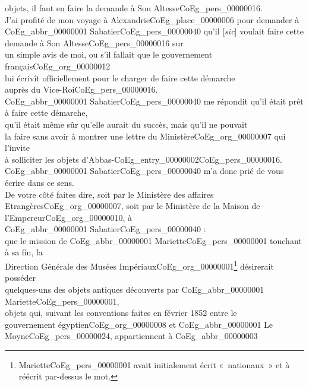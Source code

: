 \documentclass{book}
\begin{document}
objets, il faut en faire la demande à Son Altesse\gls{CoEg_pers_00000016}.\\
\indent J’ai profité de mon voyage à Alexandrie\gls{CoEg_place_00000006} pour demander à\\
\gls{CoEg_abbr_00000001} Sabatier\gls{CoEg_pers_00000040} qu’il {[\textit{sic}]} voulait faire cette demande à Son Altesse\gls{CoEg_pers_00000016} sur\\
un simple avis de moi, ou s’il fallait que le gouvernement français\gls{CoEg_org_00000012}\\
lui écrivît officiellement pour le charger de faire cette démarche\\
auprès du Vice-Roi\gls{CoEg_pers_00000016}.\\
\indent \gls{CoEg_abbr_00000001} Sabatier\gls{CoEg_pers_00000040} me répondit qu’il était prêt à faire cette démarche,\\
qu’il était même sûr qu’elle aurait du succès, mais qu’il ne pouvait\\
la faire sans avoir à montrer une lettre du Ministère\gls{CoEg_org_00000007} qui l’invite\\
à solliciter les objets d’Abbas-\Gls{CoEg_entry_00000002}\gls{CoEg_pers_00000016}.\\
\indent \gls{CoEg_abbr_00000001} Sabatier\gls{CoEg_pers_00000040} m’a donc prié de vous écrire dans ce sens.\\
\indent De votre côté faites dire, soit par le Ministère des affaires\\
Etrangères\gls{CoEg_org_00000007}, soit par le Ministère de la Maison de l’Empereur\gls{CoEg_org_00000010}, à\\
\gls{CoEg_abbr_00000001} Sabatier\gls{CoEg_pers_00000040} :\\
\indent que le mission de \gls{CoEg_abbr_00000001} Mariette\gls{CoEg_pers_00000001} touchant à sa fin, la\\
Direction Générale des Musées Impériaux\gls{CoEg_org_00000001}\footnote{Mariette\gls{CoEg_pers_00000001} avait initialement écrit «~nationaux~» et à réécrit par-dessus le mot.} désirerait posséder\\
quelques-uns des objets antiques découverts par \gls{CoEg_abbr_00000001} Mariette\gls{CoEg_pers_00000001},\\
objets qui, suivant les conventions faites en février 1852 entre le\\
gouvernement égyptien\gls{CoEg_org_00000008} et \gls{CoEg_abbr_00000001} Le Moyne\gls{CoEg_pers_00000024}, appartiennent à \gls{CoEg_abbr_00000003}\\
\end{document}
